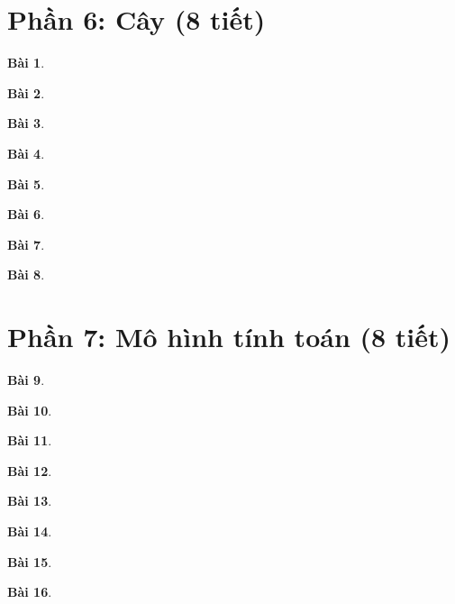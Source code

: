 \documentclass[11pt, oneside,openright,a4paper]{book}
\newtheorem{bt}{Bài }[section]
\begin{document}
 \newpage
\section[Phần 6. Cây (8 tiết)]{Phần 6: Cây (8 tiết)}

 \begin{bt}

\end{bt}
\begin{bt}

\end{bt}
\begin{bt}

\end{bt}
\begin{bt}

\end{bt}
\begin{bt}

\end{bt}
\begin{bt}

\end{bt}
\begin{bt}

\end{bt}
\begin{bt}

\end{bt}

 \newpage
\section[Phần 7. Mô hình tính toán (8 tiết)]{Phần 7: Mô hình tính toán (8 tiết)}

\begin{bt}

\end{bt}
\begin{bt}

\end{bt}

\begin{bt}

\end{bt}
\begin{bt}

\end{bt}
\begin{bt}

\end{bt}
\begin{bt}

\end{bt}
\begin{bt}

\end{bt}
\begin{bt}

\end{bt}
\end{document}
